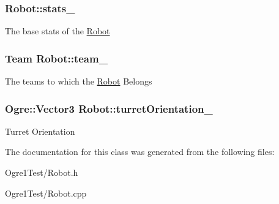 \subsubsection[{\texorpdfstring{stats\+\_\+}{stats_}}]{ Robot\+::stats\+\_\+\hspace{0.3cm}{\ttfamily [protected]}}\hypertarget{class_robot_accf825493537bfd819a7c7ac2f89fb63}{}\label{class_robot_accf825493537bfd819a7c7ac2f89fb63}
The base stats of the \hyperlink{class_robot}{Robot} 
\subsubsection[{\texorpdfstring{team\+\_\+}{team_}}]{\setlength{\rightskip}{0pt plus 5cm}Team Robot\+::team\+\_\+\hspace{0.3cm}{\ttfamily [protected]}}\hypertarget{class_robot_a3a6eab3bff35041a41f823d8a873d69e}{}\label{class_robot_a3a6eab3bff35041a41f823d8a873d69e}
The teams to which the \hyperlink{class_robot}{Robot} Belongs 
\subsubsection[{\texorpdfstring{turret\+Orientation\+\_\+}{turretOrientation_}}]{\setlength{\rightskip}{0pt plus 5cm}Ogre\+::\+Vector3 Robot\+::turret\+Orientation\+\_\+\hspace{0.3cm}{\ttfamily [protected]}}\hypertarget{class_robot_aebf0e363388dc7d6c80964016189511a}{}\label{class_robot_aebf0e363388dc7d6c80964016189511a}
Turret Orientation 

The documentation for this class was generated from the following files\+:\begin{DoxyCompactItemize}
\item 
Ogre1\+Test/Robot.\+h\item 
Ogre1\+Test/Robot.\+cpp\end{DoxyCompactItemize}
